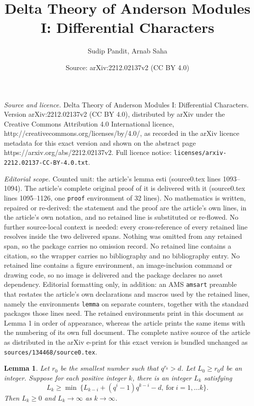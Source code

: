 \documentclass[10pt,a4paper]{amsart}
\title{Delta Theory of Anderson Modules I: Differential Characters}
\author{Sudip Pandit, Arnab Saha}
\date{Source: arXiv:2212.02137v2 (CC BY 4.0)}
\newtheorem{lemma}{Lemma}
\begin{document}
\maketitle

\noindent\emph{Source and licence.} Delta Theory of Anderson Modules I: Differential Characters. Version arXiv:2212.02137v2 (CC BY 4.0), distributed by arXiv under the Creative Commons Attribution 4.0 International licence, http://creativecommons.org/licenses/by/4.0/, as recorded in the arXiv licence metadata for this exact version and shown on the abstract page https://arxiv.org/abs/2212.02137v2. Full licence notice: \texttt{licenses/arxiv-2212.02137-CC-BY-4.0.txt}.\par\smallskip

\noindent\textit{Editorial scope.} Counted unit: the article's lemma esti (source0.tex lines 1093--1094). The article's complete original proof of it is delivered with it (source0.tex lines 1095--1126, one \texttt{proof} environment of 32 lines). No mathematics is written, repaired or re-derived: the statement and the proof are the article's own lines, in the article's own notation, and no retained line is substituted or re-flowed.  No further source-local context is needed: every cross-reference of every retained line resolves inside the two delivered spans.  Nothing was omitted from any retained span, so the package carries no omission record.  No retained line contains a citation, so the wrapper carries no bibliography and no bibliography entry.  No retained line contains a figure environment, an image-inclusion command or drawing code, so no image is delivered and the package declares no asset dependency.  Editorial formatting only, in addition: an AMS \texttt{amsart} preamble that restates the article's own declarations and macros used by the retained lines, namely the environments \texttt{lemma} on separate counters, together with the standard packages those lines need.  The retained environments print in this document as Lemma 1 in order of appearance, whereas the article prints the same items with the numbering of its own full document.  The complete native source of the article as distributed in the arXiv e-print for this exact version is bundled unchanged as \texttt{sources/134468/source0.tex}.
\begin{lemma}\label{esti} Let $r_{0}$ be the smallest number such that $q^{r_{0}}>d$. Let $L_{0}\geq r_{0}d$ be an integer. Suppose for each positive integer $k$,  there is an integer  $L_{k}$ satisfying $$L_{k}\geq \min~\{L_{k-i}+(q^{i}-1)q^{k-i}-d, ~\mathrm{for}~i=1,\ldots k\}.$$ Then $L_{k}\geq 0$ and $L_{k}\rightarrow \infty$ as $k\rightarrow \infty$.   
\end{lemma}\color{black}
\end{document}
